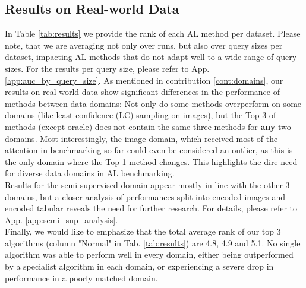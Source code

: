 \documentclass[]{article}
\begin{document}
\subsection{Results on Real-world Data}
In Table \ref{tab:results} we provide the rank of each AL method per dataset. 
Please note, that we are averaging not only over runs, but also over query sizes per dataset, impacting AL methods that do not adapt well to a wide range of query sizes.
For the results per query size, please refer to App. \ref{app:auc_by_query_size}. 
As mentioned in contribution \ref{cont:domains}, our results on real-world data show significant differences in the performance of methods between data domains:
Not only do some methods overperform on some domains (like least confidence (LC) sampling on images), but the Top-3 of methods (except oracle) does not contain the same three methods for \textbf{any} two domains.
Most interestingly, the image domain, which received most of the attention in benchmarking so far could even be considered an outlier, as this is the only domain where the Top-1 method changes.
This highlights the dire need for diverse data domains in AL benchmarking. \\
Results for the semi-supervised domain appear mostly in line with the other 3 domains, but a closer analysis of performances split into encoded images and encoded tabular reveals the need for further research.
For details, please refer to App. \ref{app:semi_sup_analysis}. \\
Finally, we would like to emphasize that the total average rank of our top 3 algorithms (column "Normal" in Tab. \ref{tab:results}) are 4.8, 4.9 and 5.1.
No single algorithm was able to perform well in every domain, either being outperformed by a specialist algorithm in each domain, or experiencing a severe drop in performance in a poorly matched domain.
\end{document}
